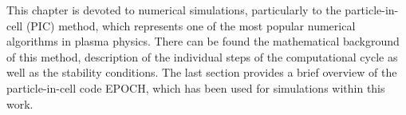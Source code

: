 This chapter is devoted to numerical simulations, particularly to the particle-in-cell (PIC) method, which represents one of the most popular numerical algorithms in plasma physics. There can be found the mathematical background of this method, description of the individual steps of the computational cycle as well as the stability conditions. The last section provides a brief overview of the particle-in-cell code EPOCH, which has been used for simulations within this work.